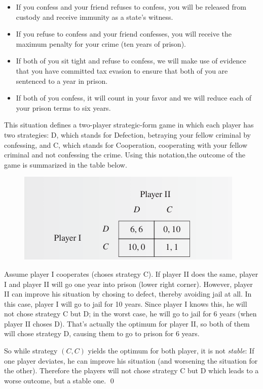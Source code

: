 \begin{itemize}
	\item If you confess and your friend refuses to confess, you will be released from custody and receive immunity as a state’s witness.
	\item If you refuse to confess and your friend confesses, you will receive the maximum penalty for your crime (ten years of prison).
	\item If both of you sit tight and refuse to confess, we will make use of evidence that you have committed tax evasion to ensure that both of you are sentenced to a year in prison.
	\item If both of you confess, it will count in your favor and we will reduce each of your prison terms to six years.
\end{itemize}

This situation defines a two-player strategic-form game in which each player has two strategies: D, which stands for Defection, betraying your fellow criminal by confessing, and C, which stands for Cooperation, cooperating with your fellow criminal and not confessing the crime. Using this notation,the outcome of the game is summarized in the table below.

\begin{figure}[H]
    \centering
    \includegraphics[scale=0.75]{images/2023-10-10-game_theory_20.png}
\end{figure}

Assume player I cooperates (choses strategy C). If player II does the same, player I and player II will go one year into prison (lower right corner). However, player II can improve his situation by chosing to defect, thereby avoiding jail at all. In this case, player I will go to jail for 10 years. Since player I knows this, he will not chose strategy C but D; in the worst case, he will go to jail for 6 years (when player II choses D). That's actually the optimum for player II, so both of them will chose strategy D, causing them to go to prison for 6 years.

So while strategy $(C,C)$ yields the optimum for both player, it is not \emph{stable}: If one player deviates, he can improve his situation (and worsening the situation for the other). Therefore the players will not chose strategy C but D which leads to a worse outcome, but a stable one. \qed


